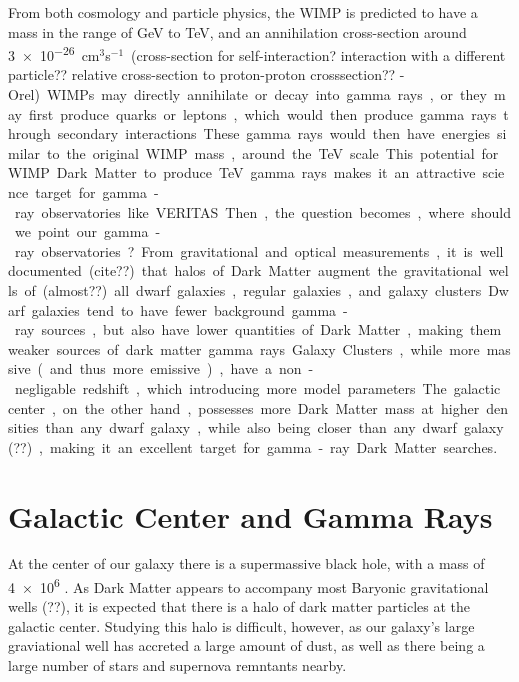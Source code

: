 From both cosmology and particle physics, the WIMP is predicted to have a mass in the range of GeV to TeV, and an annihilation cross-section around \nicetilde{}\SI{3e-26}{cm${}^3$s${}^{-1}$} {\color{red}(cross-section for self-interaction? interaction with a different particle?? relative cross-section to proton-proton crosssection?? -Orel)}.
WIMPs may directly annihilate or decay into gamma rays, or they may first produce quarks or leptons, which would then produce gamma rays through secondary interactions.
These gamma rays would then have energies similar to the original WIMP mass, around the TeV scale.
This potential for WIMP Dark Matter to produce TeV gamma rays makes it an attractive science target for gamma-ray observatories like VERITAS.

Then, the question becomes, where should we point our gamma-ray observatories?
From gravitational and optical measurements, it is well documented {\color{red}(cite??)} that halos of Dark Matter augment the gravitational wells of {\color{red}(almost??)} all dwarf galaxies, regular galaxies, and galaxy clusters.
Dwarf galaxies tend to have fewer background gamma-ray sources, but also have lower quantities of Dark Matter, making them weaker sources of dark matter gamma rays.
Galaxy Clusters, while more massive (and thus more emissive), have a non-negligable redshift, which introducing more model parameters.
The galactic center, on the other hand, possesses more Dark Matter mass at higher densities than any dwarf galaxy, while also being closer than any dwarf galaxy {\color{red}(??)}, making it an excellent target for gamma-ray Dark Matter searches.


\section{Galactic Center and Gamma Rays}

At the center of our galaxy there is a supermassive black hole, with a mass of \SI{4e6}{\Msol{}} \cite{sgra_massdist}.
As Dark Matter appears to accompany most Baryonic gravitational wells {\color{red}(??)}, it is expected that there is a halo of dark matter particles at the galactic center.
Studying this halo is difficult, however, as our galaxy's large graviational well has accreted a large amount of dust, as well as there being a large number of stars and supernova remntants nearby.

